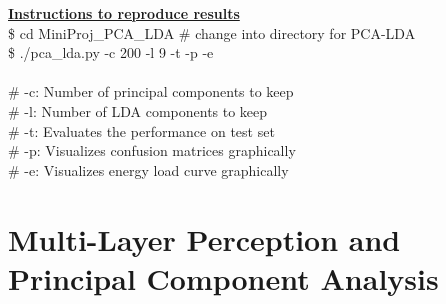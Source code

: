 \documentclass[a4paper,10pt,fleqn]{article}
\newcommand{\note}[1]{
\begin{boxitpara}{}%
\textbf{\underline{Instructions to reproduce results}} #1
\end{boxitpara}}
\begin{document}
\note{\\ \$ cd  {MiniProj\_PCA\_LDA} \# change into directory for PCA-LDA \\
\$ ./pca\_lda.py -c 200 -l 9 -t -p -e\\\\
\# -c: Number of principal components to keep\\
\# -l: Number of LDA components to keep\\
\# -t: Evaluates the performance on test set\\
\# -p: Visualizes confusion matrices graphically\\
\# -e: Visualizes energy load curve graphically
}
\section{ Multi-Layer Perception and Principal Component Analysis}\label{sec:pca_mlp}
\end{document}
